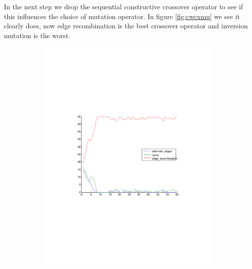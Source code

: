 \documentclass[a4paper]{article}
\begin{document}
In the next step we drop the sequential constructive crossover operator
to see if this influences the choice of mutation operator.
In figure \ref{fig:cwcxmu} we see it clearly does, now edge
recombination is the best crossover operator and inversion mutation is
the worst.

\begin{figure}[h]
	\centering
    \begin{subfigure}[h]{0.49\textwidth}
    \includegraphics[width=\textwidth,trim={4cm 8cm 4cm 8cm},clip]{cwcx}
    \end{subfigure}
    \begin{subfigure}[h]{0.49\textwidth}

\end{subfigure}
\end{figure}
\end{document}
